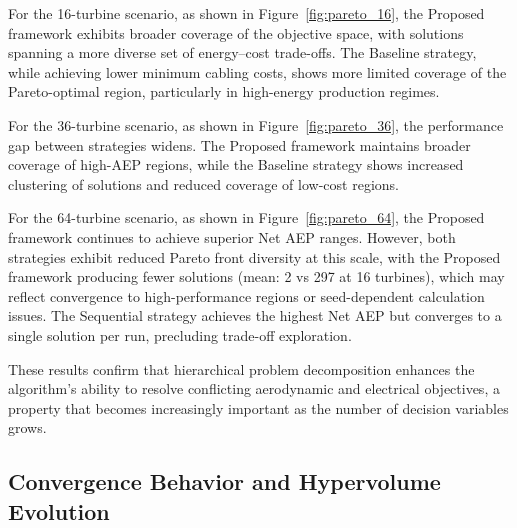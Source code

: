 \documentclass[format=sigconf,anonymous=true,review=true]{acmart}
\begin{document}
For the 16-turbine scenario, as shown in Figure~\ref{fig:pareto_16}, the Proposed framework exhibits broader coverage of the objective space, with solutions spanning a more diverse set of energy--cost trade-offs. The Baseline strategy, while achieving lower minimum cabling costs, shows more limited coverage of the Pareto-optimal region, particularly in high-energy production regimes. 

For the 36-turbine scenario, as shown in Figure~\ref{fig:pareto_36}, the performance gap between strategies widens. The Proposed framework maintains broader coverage of high-AEP regions, while the Baseline strategy shows increased clustering of solutions and reduced coverage of low-cost regions.

For the 64-turbine scenario, as shown in Figure~\ref{fig:pareto_64}, the Proposed framework continues to achieve superior Net AEP ranges. However, both strategies exhibit reduced Pareto front diversity at this scale, with the Proposed framework producing fewer solutions (mean: 2 vs 297 at 16 turbines), which may reflect convergence to high-performance regions or seed-dependent calculation issues. The Sequential strategy achieves the highest Net AEP but converges to a single solution per run, precluding trade-off exploration.


These results confirm that hierarchical problem decomposition enhances the algorithm's ability to resolve conflicting aerodynamic and electrical objectives, a property that becomes increasingly important as the number of decision variables grows.


\subsection{Convergence Behavior and Hypervolume Evolution}
\end{document}
